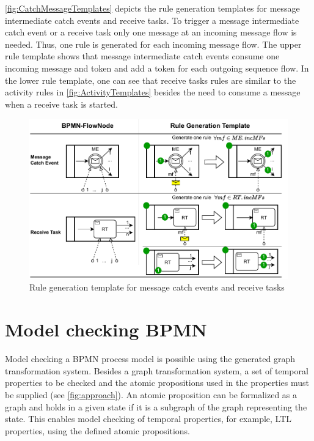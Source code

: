 \documentclass[submission, copyright, creativecommons]{eptcs}
\begin{document}
\autoref{fig:CatchMessageTemplates} depicts the rule generation templates for message intermediate catch events and receive tasks.
To trigger a message intermediate catch event or a receive task only one message at an incoming message flow is needed.
Thus, one rule is generated for each incoming message flow.
The upper rule template shows that message intermediate catch events consume one incoming message and token and add a token for each outgoing sequence flow.
In the lower rule template, one can see that receive tasks rules are similar to the activity rules in \autoref{fig:ActivityTemplates} besides the need to consume a message when a receive task is started.
\begin{figure}[h]
    \centering
    \includegraphics[width=1\textwidth]{images/catch_messages.pdf}
    \caption{Rule generation template for message catch events and receive tasks}
    \label{fig:CatchMessageTemplates}
\end{figure}



\section{Model checking BPMN} \label{sec:modelChecking}

Model checking a BPMN process model is possible using the generated graph transformation system.
Besides a graph transformation system, a set of temporal properties to be checked and the atomic propositions used in the properties must be supplied (see \cref{fig:approach}).
An atomic proposition can be formalized as a graph and holds in a given state if it is a subgraph of the graph representing the state.
This enables model checking of temporal properties, for example, LTL properties, using the defined atomic propositions.
\end{document}

